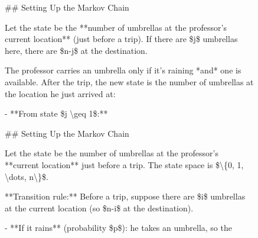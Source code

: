 \begin{figure}[t]
\vspace{12pt}

\noindent
\begin{answercol}[equal height group=ansX0]
  \caret{}\par\vspace{4pt}
  \raggedright \#\# Setting Up the Markov Chain\par\vspace{2pt}
  Let the state be the **number of umbrellas at the professor's current location** (just before a trip). If there are \$j\$ umbrellas here, there are \$n-j\$ at the destination.\par\vspace{2pt}
  The professor carries an umbrella only if it's raining *and* one is available. After the trip, the new state is the number of umbrellas at the location he just arrived at:\par\vspace{2pt}
  - **From state \$j \textbackslash{}geq 1\$:**\par\vspace{3pt}\elide
\end{answercol}\hspace{\columnsep}%
\begin{answercol}[equal height group=ansX0]
  \caret{}\par\vspace{4pt}
  \raggedright \#\# Setting Up the Markov Chain\par\vspace{2pt}
  Let the state be the number of umbrellas at the professor's **current location** just before a trip. The state space is \$\textbackslash{}\{0, 1, \textbackslash{}dots, n\textbackslash{}\}\$.\par\vspace{2pt}
  **Transition rule:** Before a trip, suppose there are \$i\$ umbrellas at the current location (so \$n-i\$ at the destination).\par\vspace{2pt}
  - **If it rains** (probability \$p\$): he takes an umbrella, so the\par\vspace{3pt}\elide
\end{answercol}\hspace{\columnsep}%
\begin{answercol}[equal height group=ansX0]
  \caret{}\par\vspace{4pt}

\end{answercol}
\end{figure}
